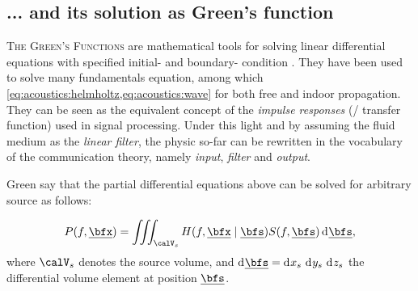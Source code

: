 \subsection{... and its solution as Green's function}
\textsc{The Green's Functions} are mathematical tools for solving linear differential equations with specified initial- and boundary- condition \cite{Duffy2015}.
They have been used to solve many fundamentals equation, among which \cref{eq:acoustics:helmholtz,eq:acoustics:wave} for both free and indoor propagation.
They can be seen as the equivalent concept of the \textit{impulse responses} (\resp/ transfer function) used in signal processing.
Under this light and by assuming the fluid  medium as the \textit{linear filter}, the physic so-far can be rewritten in the vocabulary of
the communication theory, namely \textit{input}, \textit{filter} and \textit{output}.

Green say that the partial differential equations above can be solved for arbitrary source as follows:

\begin{equation}
    \label{eq:acoustics:helmholz_conv}
    P(f, \positionMicrophone) = \iiint_{\volume_\contSource} H(f, \positionMicrophone \mid \positionSource) S(f, \positionSource) \kdiff\positionSource
    ,
\end{equation}
where $\volume_\contSource$ denotes the source volume,
and  $\kdiff\positionSource =  \kdiff{x_\contSource}\,\kdiff{y_\contSource}\,\kdiff{z_\contSource}$ the  differential  volume element at position $\positionSource$.

